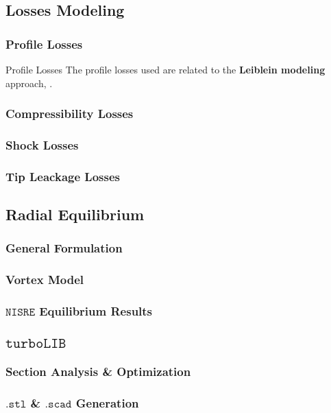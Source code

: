 \subsection{Losses Modeling}
\subsubsection{Profile Losses}
	\begin{frame}{Profile Losses}
		The profile losses used are related to the \textbf{Leiblein modeling} approach, \cite[Ch. 6]{axial2004}.
				
	\end{frame}
\subsubsection{Compressibility Losses}
\subsubsection{Shock Losses}
\subsubsection{Tip Leackage Losses}
\subsection{Radial Equilibrium}
\subsubsection{General Formulation}
\subsubsection{Vortex Model}
\subsubsection{$\mathtt{NISRE}$ Equilibrium Results}
\subsection{$\mathtt{turboLIB}$}
\subsubsection{Section Analysis \& Optimization}
\subsubsection{$\mathtt{.stl}$ \& $\mathtt{.scad}$ Generation}

